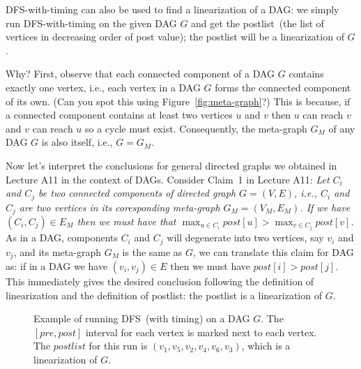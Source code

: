 DFS-with-timing can also be used to find a linearization of a DAG: we simply run DFS-with-timing on the given DAG $G$
and get the postlist~(the list of vertices in decreasing order of post value); the postlist will be a linearization of $G$.

Why? First, observe that each connected component of a DAG $G$ contains exactly one vertex, i.e., each vertex in a DAG $G$
forms the connected component of its own. (Can you spot this using Figure~\ref{fig:meta-graph}?)
This is because, if a connected component contains at least two vertices $u$ and $v$ then $u$ can reach $v$ and $v$ can reach $u$ so a cycle must exist.
Consequently, the meta-graph $G_M$ of any DAG $G$ is also itself, i.e., $G= G_M$. %

Now let's interpret the conclusions for general directed graphs we obtained in  Lecture A11 in the context of DAGs.
Consider Claim~1 in Lecture A11: \emph{Let $C_i$ and $C_j$ be two connected components of directed graph $G = (V, E)$, i.e., $C_i$ and $C_j$ are two
vertices in its coresponding meta-graph $G_M = (V_M, E_M)$. If we have $(C_i, C_j) \in E_M$ then
we must have that $\max_{u\in C_i} post[u] > \max_{v\in C_j} post[v]$.}
As in a DAG, components $C_i$ and $C_j$ will degenerate into two vertices, say $v_i$ and $v_j$, and
its meta-graph $G_M$ is the same as $G$, we can translate this claim for DAG as: 
if in a DAG we have $(v_i, v_j) \in E$ then we must have $post[i] > post[j]$.
This immediately gives the desired conclusion following the definition of linearization
and the definition of postlist: the postlist is a linearization of $G$.

\begin{figure}[h!]
\centering{}
\caption{Example of running DFS~(with timing) on a DAG $G$. The $[pre,post]$ interval for each vertex
is marked next to each vertex. The $postlist$ for this run is $(v_1, v_5, v_2, v_4, v_6, v_3)$, which is a linearization of $G$.}
\end{figure}


